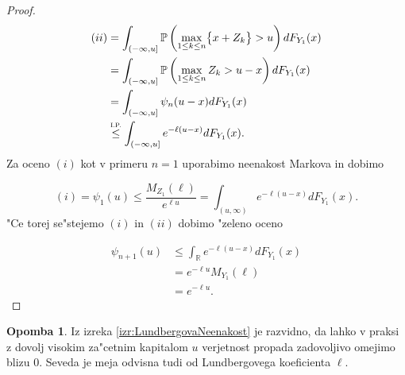 \documentclass[12pt, a4paper, reqno]{amsart}
\theoremstyle{definition}
\newtheorem{opomba}[definicija]{Opomba}
\theoremstyle{plain}
\newcommand{\R}{\mathbb{R}}
\newcommand{\Prob}{\mathbb{P}}
\newcommand{\1}{\mathds{1}}
\begin{document}
\begin{proof}
\begin{align*}
                    (ii) &= \int_{(-\infty, u]}\Prob\left(\max_{1\leq k\leq n}\bigl\{x + Z_k\bigr\} > u\right)dF_{Y_1}(x) \\
                         &= \int_{(-\infty, u]}\Prob\left(\max_{1\leq k\leq n}Z_k > u - x\right)dF_{Y_1}(x) \\
                         &= \int_{(-\infty, u]}\psi_n(u - x)dF_{Y_1}(x) \\
                         &\stackrel{\text{\scalebox{0.8}{I.P.}}}{\leq} \int_{(-\infty, u]}e^{-\ell(u - x)}dF_{Y_1}(x). \\
                \end{align*}
                Za oceno $(i)$ kot v primeru $n=1$ uporabimo neenakost Markova in dobimo

                \begin{equation*}
                    (i) = \psi_1(u) \leq \frac{M_{Z_1}(\ell)}{e^{\ell u}} = \int_{(u, \infty)}e^{-\ell (u-x)}dF_{Y_1}(x).
                \end{equation*}
                "Ce torej se"stejemo $(i)$ in $(ii)$ dobimo "zeleno oceno

                \begin{align*}
                    \psi_{n+1}(u) &\leq \int_{\R}e^{-\ell (u - x)}dF_{Y_1}(x) \\
                                  &= e^{-\ell u}M_{Y_1}(\ell) \\
                                  &= e^{-\ell u}.
                \end{align*}

            \end{proof}

            \begin{opomba}
                Iz izreka \ref{izr:LundbergovaNeenakost} je razvidno, da lahko v praksi z
                 dovolj visokim za"cetnim kapitalom
                $u$ verjetnost propada zadovoljivo omejimo blizu $0$. Seveda je meja 
                odvisna tudi od Lundbergovega koeficienta $\ell$.
                \label{op:LundbergovaNeenakost}
            \end{opomba}
\end{document}
